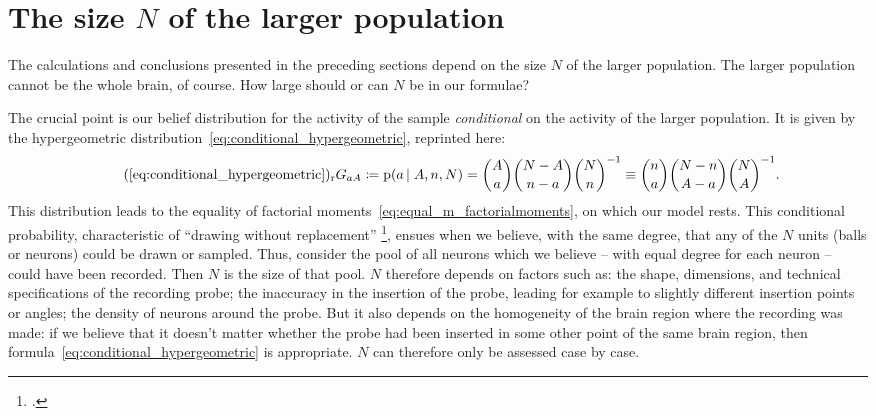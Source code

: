 \documentclass[\ifafour a4paper,12pt,\else a5paper,10pt,\fi%
onecolumn,oneside,article,%
british%
]{memoir}
\theoremstyle{remark}
\theoremstyle{innote}
\newcommand*{\citep}{\footcites}
\newcommand*{\defd}{\coloneqq}
\newcommand*{\pf}{\mathrm{p}}%
\renewcommand*{\|}{\nonscript\,\vert\nonscript\;\mathopen{}}
\newcommand*{\sect}{\S}%
\newcommand*{\chap}{ch.}%
\newcommand*{\eg}{{e.g.}}
\newcommand*{\labelbis}[1]{\tag*{(\ref{#1})$_\text{r}$}}
\newcommand*{\yG}{G}
\newcommand*{\yAv}{A}
\newcommand*{\yav}{a}
\newcommand*{\ya}{\yav}%
\newcommand*{\yA}{\yAv}%
\begin{document}
\section{The size $N$ of the larger population}
\label{sec:N}

%
% 

The calculations and conclusions presented in the preceding sections depend
on the size $N$ of the larger population. The larger population cannot be
the whole brain, of course. How large should or can $N$ be in our formulae?

The crucial point is our belief distribution for the activity of the sample
\emph{conditional} on the activity of the larger population. It is given by
the hypergeometric distribution~\eqref{eq:conditional_hypergeometric},
reprinted here:
\begin{equation}
  \labelbis{eq:conditional_hypergeometric}
  \yG_{\ya\yA} \defd \pf(\ya \|\yA, n,N)=
    \binom{\yA}{\ya}\binom{N-\yA}{n-\ya}\binom{N}{n}^{-1}
\equiv \binom{n}{\ya}\binom{N-n}{\yA-\ya}\binom{N}{\yA}^{-1}.
\end{equation}
This distribution leads to the equality of factorial
moments~\eqref{eq:equal_m_factorialmoments}, on which our model rests. This
conditional probability, characteristic of \enquote{drawing without
  replacement}
\citep[\eg][\chap~3]{jaynes1994_r2003}, %
ensues when we believe, with the same degree, that any of the $N$ units
(balls or neurons) could be drawn or sampled. Thus, consider the pool of
all neurons which we believe -- with equal degree for each neuron -- could
have been recorded. Then $N$ is the size of that pool. $N$ therefore depends on
factors such as: the shape, dimensions, and technical specifications of the
recording probe; the inaccuracy in the insertion of the probe, leading for
example to slightly different insertion points or angles; the density of
neurons around the probe. But it also depends on the homogeneity of the
brain region where the recording was made: if we believe that it doesn't
matter whether the probe had been inserted in some other point of the same
brain region, then formula~\eqref{eq:conditional_hypergeometric} is
appropriate. $N$ can therefore only be assessed case by case.
\end{document}
